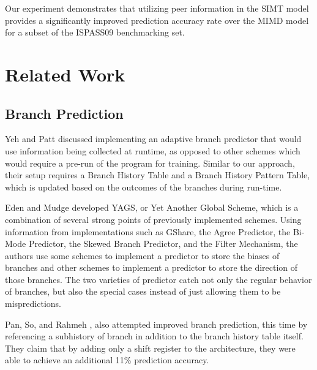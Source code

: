 \documentclass[conference]{IEEEtran}
\begin{document}
Our experiment demonstrates that utilizing peer information in the SIMT model provides a significantly improved prediction accuracy rate over the MIMD model
for a subset of the ISPASS09 \cite{ispass09} benchmarking set.

\section{Related Work}

\subsection{Branch Prediction}

Yeh and Patt \cite{Yeh91} discussed implementing an adaptive branch predictor that would use information being collected at runtime, as opposed to other schemes which would require a pre-run of the program for training.  Similar to our approach, their setup requires a Branch History Table and a Branch History Pattern Table, which is updated based on the outcomes of the branches during run-time.

Eden and Mudge \cite{yags98} developed YAGS, or Yet Another Global Scheme, which is a combination of several strong points of previously implemented schemes.  Using information from implementations such as GShare, the 
Agree Predictor, the Bi-Mode Predictor, the Skewed Branch Predictor, and the Filter Mechanism, the authors 
use some schemes to implement a predictor to store the biases of branches and other schemes to implement a predictor to store the 
direction of those branches.  The two varieties of predictor catch not only the regular behavior of branches, but also the special cases instead of just allowing them to be mispredictions.

Pan, So, and Rahmeh \cite{Pan92}, also attempted improved branch prediction, this time by referencing a subhistory of branch in addition to the branch history table itself.  They claim that by adding only a shift register to the architecture, they were able to achieve an additional 11\% prediction accuracy.


\end{document}
